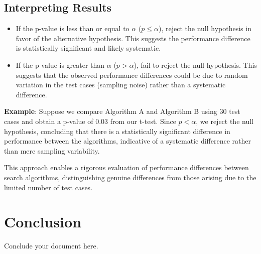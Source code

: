 \documentclass{article}
\begin{document}
\subsection{Interpreting Results}
\begin{itemize}
    \item If the p-value is less than or equal to \(\alpha\) (\(p \leq \alpha\)), reject the null hypothesis in favor of the alternative hypothesis. This suggests the performance difference is statistically significant and likely systematic.
    \item If the p-value is greater than \(\alpha\) (\(p > \alpha\)), fail to reject the null hypothesis. This suggests that the observed performance differences could be due to random variation in the test cases (sampling noise) rather than a systematic difference.
\end{itemize}

\textbf{Example}: Suppose we compare Algorithm A and Algorithm B using 30 test cases and obtain a p-value of 0.03 from our t-test. Since \(p < \alpha\), we reject the null hypothesis, concluding that there is a statistically significant difference in performance between the algorithms, indicative of a systematic difference rather than mere sampling variability.

This approach enables a rigorous evaluation of performance differences between search algorithms, distinguishing genuine differences from those arising due to the limited number of test cases.

\section{Conclusion}
Conclude your document here.
\end{document}
